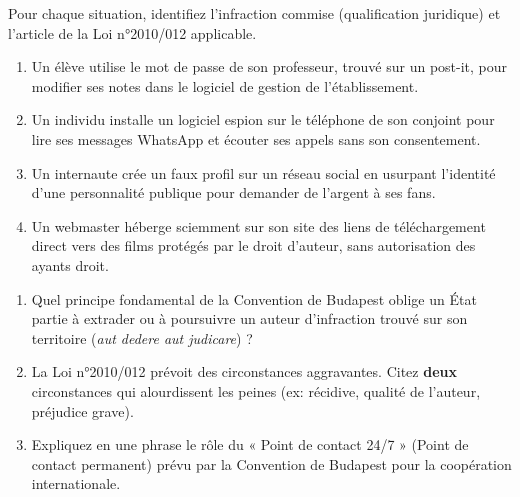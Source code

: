 \documentclass[11pt]{article}
\begin{document}
\begin{exercice}
Pour chaque situation, identifiez l'infraction commise (qualification juridique) et l'article de la Loi n°2010/012 applicable.
\begin{enumerate}
    \item Un élève utilise le mot de passe de son professeur, trouvé sur un post-it, pour modifier ses notes dans le logiciel de gestion de l'établissement.
    \item Un individu installe un logiciel espion sur le téléphone de son conjoint pour lire ses messages WhatsApp et écouter ses appels sans son consentement.
    \item Un internaute crée un faux profil sur un réseau social en usurpant l'identité d'une personnalité publique pour demander de l'argent à ses fans.
    \item Un webmaster héberge sciemment sur son site des liens de téléchargement direct vers des films protégés par le droit d'auteur, sans autorisation des ayants droit.
\end{enumerate}
\end{exercice}

\begin{exercice}
\begin{enumerate}
    \item Quel principe fondamental de la Convention de Budapest oblige un État partie à extrader ou à poursuivre un auteur d'infraction trouvé sur son territoire (\textit{aut dedere aut judicare}) ?
    \item La Loi n°2010/012 prévoit des circonstances aggravantes. Citez \textbf{deux} circonstances qui alourdissent les peines (ex: récidive, qualité de l'auteur, préjudice grave).
    \item Expliquez en une phrase le rôle du « Point de contact 24/7 » (Point de contact permanent) prévu par la Convention de Budapest pour la coopération internationale.
\end{enumerate}
\end{exercice}
\end{document}
